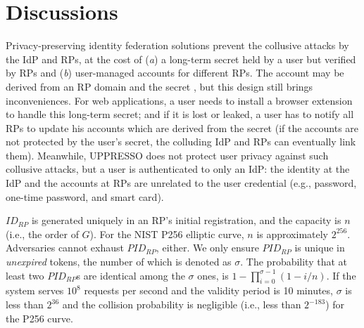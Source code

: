 \section{Discussions}
\label{sec:discussion}

Privacy-preserving identity federation solutions \cite{ELPASSO,UnlimitID,hyperledge-idemix,PseudoID,Opaak,uprov}
 prevent the collusive attacks by the IdP and RPs,
    at the cost of (\emph{a}) a long-term secret held by a user but verified by RPs
        and (\emph{b}) user-managed accounts \cite{PseudoID} for different RPs.
The account may be derived from an RP domain and the secret \cite{ELPASSO,UnlimitID,Opaak,uprov,idemix},
  but this design still brings inconveniences.
For web applications, a user needs to install a browser extension to handle this long-term secret;
  and if it is lost or leaked,
       a user has to notify all RPs to update his accounts which are derived from the secret
        (if the accounts are not protected by the user's secret, the colluding IdP and RPs can eventually link them).
Meanwhile,
UPPRESSO does not protect user privacy against such collusive attacks,
    but a user is authenticated to only an IdP:
         the identity at the IdP and the accounts at RPs
                are unrelated to the user credential (e.g., password, one-time password, and smart card).




\vspace{0.5mm}
$ID_{RP}$ is generated uniquely in an RP's initial registration,
    and the capacity is $n$ (i.e., the order of $G$). For the NIST P256 elliptic curve, $n$ is approximately $2^{256}$.
Adversaries cannot exhaust $PID_{RP}$, either.
We only ensure $PID_{RP}$ is unique in \emph{unexpired} tokens,
    the number of which is denoted as $\sigma$.
The probability that at least two $PID_{RP}$s are identical among the $\sigma$ ones,
    is $1-\prod_{i=0}^{\sigma-1}(1-i/n)$.
If the system serves $10^{8}$ requests per second and the validity period is 10 minutes,
     $\sigma$ is less than $2^{36}$ and the collision probability is negligible (i.e., less than $2^{-183}$) for the P256 curve.

